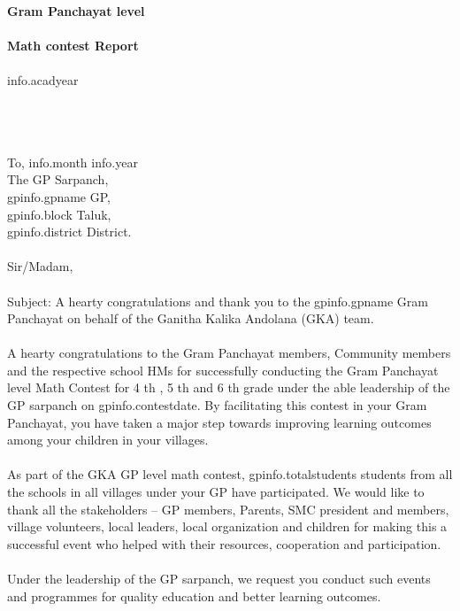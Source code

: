 \documentclass[12pt]{article}
\begin{document}
\begin{titlepage}
    \thispagestyle{title}
    \begin{center}
    \vspace*{10.5cm}
     \textbf{\huge Gram Panchayat level} \\~\\
        \textbf{\huge Math contest Report} \\~\\
	    \Large{{info.acadyear}}
    \end{center}
\end{titlepage}
\pagebreak

\thispagestyle{plain}
{
\setlength{\parindent}{0in}
~\\~\\~\\
To, \hfill  {{info.month}} {{info.year}} \\ [2ex]
The GP Sarpanch,\\ [1ex]
{{gpinfo.gpname}} GP,\\ [1ex]
{{gpinfo.block}} Taluk,\\ [1ex]
{{gpinfo.district}} District.
\\~\\ [2ex]
Sir/Madam,
\\~\\
Subject: A hearty congratulations and thank you to the {{gpinfo.gpname}} Gram Panchayat on behalf of the Ganitha Kalika Andolana (GKA) team.
\\~\\
A hearty congratulations to the Gram Panchayat members, Community members and the respective school HMs for successfully conducting the Gram Panchayat level Math Contest for 4 th , 5 th and 6 th grade under the able leadership of the GP sarpanch on {{gpinfo.contestdate}}. By facilitating this contest in your Gram Panchayat, you have taken a major step towards improving learning outcomes among your children in your villages.
\\~\\
As part of the GKA GP level math contest, {{gpinfo.totalstudents}} students from all the schools in all villages under your GP have participated. We would like to thank all the stakeholders – GP members, Parents, SMC president and members, village volunteers, local leaders, local organization and children for making this a successful event who helped with their resources, cooperation and participation.
\\~\\
Under the leadership of the GP sarpanch, we request you conduct such events and programmes for quality education and better learning outcomes.
}
\end{document}
